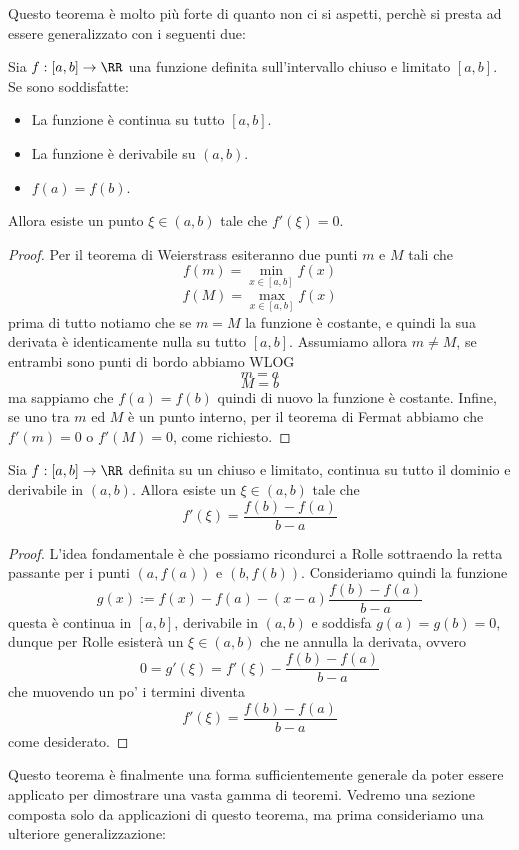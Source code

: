 \documentclass[11pt]{scrartcl}
\begin{document}
	Questo teorema è molto più forte di quanto non ci si aspetti, perchè si presta ad essere generalizzato con i seguenti due:
	\begin{theorem}[Rolle]
		Sia $f:[a,b]\to\RR$ una funzione definita sull'intervallo chiuso e limitato $[a,b]$. Se sono soddisfatte:
		\begin{itemize}
			\item La funzione è continua su tutto $[a,b]$.
			\item La funzione è derivabile su $(a,b)$.
			\item $f(a)=f(b)$.
		\end{itemize} 
		Allora esiste un punto $\xi\in (a,b)$ tale che $f'(\xi)=0$.
	\end{theorem}
	\begin{proof}
		Per il teorema di Weierstrass esiteranno due punti $m$ e $M$ tali che 
		$$f(m)=\min_{x\in[a,b]}f(x)$$
		$$f(M)=\max_{x\in[a,b]}f(x)$$
		prima di tutto notiamo che se $m=M$ la funzione è costante, e quindi la sua derivata è identicamente nulla su tutto $[a,b]$. Assumiamo allora $m\ne M$, se entrambi sono punti di bordo abbiamo WLOG
		$$m=a$$
		$$M=b$$
		ma sappiamo che $f(a)=f(b)$ quindi di nuovo la funzione è costante. Infine, se uno tra $m$ ed $M$ è un punto interno, per il teorema di Fermat abbiamo che $f'(m)=0$ o $f'(M)=0$, come richiesto.
	\end{proof}
	\begin{theorem}[Lagrange]
		Sia $f:[a,b]\to\RR$ definita su un chiuso e limitato, continua su tutto il dominio e derivabile in $(a,b)$. Allora esiste un $\xi\in (a,b)$ tale che 
		$$f'(\xi)=\frac{f(b)-f(a)}{b-a}$$
	\end{theorem}
	\begin{proof}
		L'idea fondamentale è che possiamo ricondurci a Rolle sottraendo la retta passante per i punti $(a,f(a))$ e $(b,f(b))$. Consideriamo quindi la funzione
		$$g(x):=f(x)-f(a)-(x-a)\frac{f(b)-f(a)}{b-a}$$
		questa è continua in $[a,b]$, derivabile in $(a,b)$ e soddisfa $g(a)=g(b)=0$, dunque per Rolle esisterà un $\xi\in (a,b)$ che ne annulla la derivata, ovvero
		$$0=g'(\xi)=f'(\xi)-\frac{f(b)-f(a)}{b-a}$$
		che muovendo un po' i termini diventa
		$$f'(\xi)=\frac{f(b)-f(a)}{b-a}$$
		come desiderato.
	\end{proof}
	Questo teorema è finalmente una forma sufficientemente generale da poter essere applicato per dimostrare una vasta gamma di teoremi. Vedremo una sezione composta solo da applicazioni di questo teorema, ma prima consideriamo una ulteriore generalizzazione:
\end{document}
